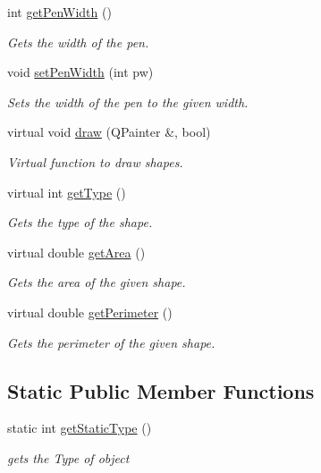 \begin{DoxyCompactItemize}
int \hyperlink{classPolygon_af05a6abd65de0aba9704b9acbbba80c5}{get\+Pen\+Width} ()
\begin{DoxyCompactList}\small\item\em Gets the width of the pen. \end{DoxyCompactList}\item 
void \hyperlink{classPolygon_a4078d739e8bcfcef4402077afa24a687}{set\+Pen\+Width} (int pw)
\begin{DoxyCompactList}\small\item\em Sets the width of the pen to the given width. \end{DoxyCompactList}\item 
virtual void \hyperlink{classPolygon_a324e212e7f096a104f84fb854be50215}{draw} (Q\+Painter \&, bool)
\begin{DoxyCompactList}\small\item\em Virtual function to draw shapes. \end{DoxyCompactList}\item 
virtual int \hyperlink{classPolygon_aa17e86eda9587c95a0e498e60033dfa3}{get\+Type} ()
\begin{DoxyCompactList}\small\item\em Gets the type of the shape. \end{DoxyCompactList}\item 
virtual double \hyperlink{classPolygon_a31c8c5320acfb934bce0441efb0fe837}{get\+Area} ()
\begin{DoxyCompactList}\small\item\em Gets the area of the given shape. \end{DoxyCompactList}\item 
virtual double \hyperlink{classPolygon_a295ef7fe3b5ed921ae15a757680b159a}{get\+Perimeter} ()
\begin{DoxyCompactList}\small\item\em Gets the perimeter of the given shape. \end{DoxyCompactList}\end{DoxyCompactItemize}
\subsection*{Static Public Member Functions}
\begin{DoxyCompactItemize}
\item 
static int \hyperlink{classPolygon_a8aeea28a673b2ef2df1dd150ebb4f8d9}{get\+Static\+Type} ()
\begin{DoxyCompactList}\small\item\em gets the Type of object \end{DoxyCompactList}\end{DoxyCompactItemize}


